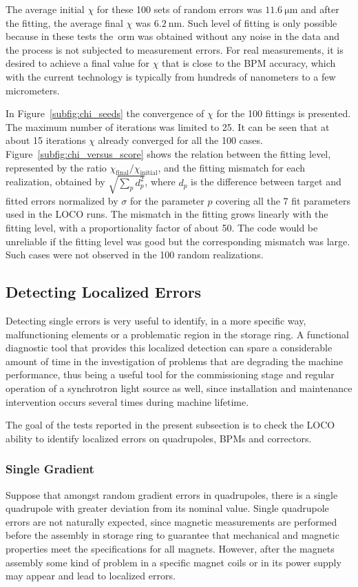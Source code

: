 The average initial $\chi$ for these 100 sets of random errors was $\SI{11.6}{\micro\meter}$ and after the fitting, the average final $\chi$ was $\SI{6.2}{\nano\meter}$. Such level of fitting is only possible because in these tests the~\gls{orm} was obtained without any noise in the data and the process is not subjected to measurement errors. For real measurements, it is desired to achieve a final value for $\chi$ that is close to the BPM accuracy, which with the current technology is typically from hundreds of nanometers to a few micrometers.

In Figure~\ref{subfig:chi_seeds} the convergence of $\chi$ for the 100 fittings is presented. The maximum number of iterations was limited to 25. It can be seen that at about 15 iterations $\chi$ already converged for all the 100 cases. Figure~\ref{subfig:chi_versus_score} shows the relation between the fitting level, represented by the ratio $\chi_{\mathrm{final}}/\chi_{\mathrm{initial}}$, and the fitting mismatch for each realization, obtained by $\sqrt{\sum_{p}d_p^2}$, where $d_p$ is the difference between target and fitted errors normalized by $\sigma$ for the parameter $p$ covering all the 7 fit parameters used in the LOCO runs. The mismatch in the fitting grows linearly with the fitting level, with a proportionality factor of about 50. The code would be unreliable if the fitting level was good but the corresponding mismatch was large. Such cases were not observed in the 100 random realizations.
\subsection{Detecting Localized Errors}
Detecting single errors is very useful to identify, in a more specific way, malfunctioning elements or a problematic region in the storage ring. A functional diagnostic tool that provides this localized detection can spare a considerable amount of time in the investigation of problems that are degrading the machine performance, thus being a useful tool for the commissioning stage and regular operation of a synchrotron light source as well, since installation and maintenance intervention occurs several times during machine lifetime.

The goal of the tests reported in the present subsection is to check the LOCO ability to identify localized errors on quadrupoles, BPMs and correctors. 

\subsubsection{Single Gradient}
Suppose that amongst random gradient errors in quadrupoles, there is a single quadrupole with greater deviation from its nominal value. Single quadrupole errors are not naturally expected, since magnetic measurements are performed before the assembly in storage ring to guarantee that mechanical and magnetic properties meet the specifications for all magnets. However, after the magnets assembly some kind of problem in a specific magnet coils or in its power supply may appear and lead to localized errors.

